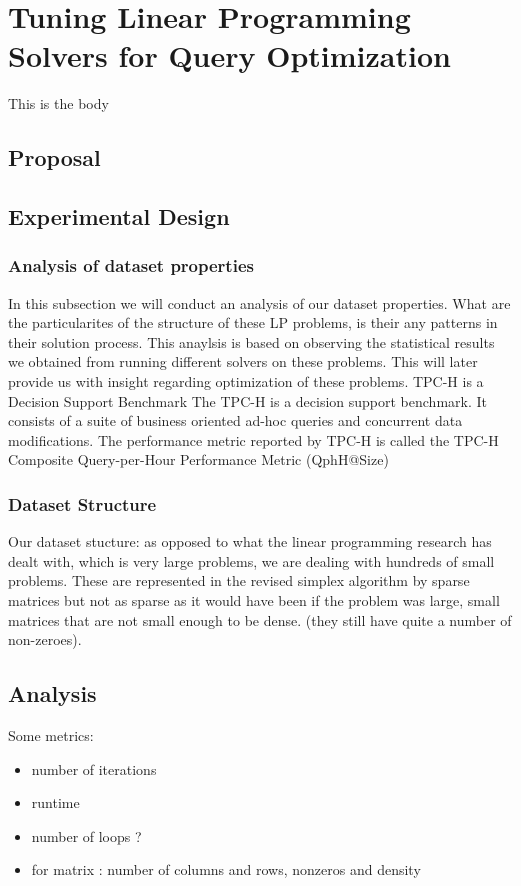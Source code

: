 
\chapter{Tuning Linear Programming Solvers for Query Optimization}\label{chapter:linearprogramming}
This is the body
\section{Proposal}

\section{Experimental Design}
\subsection{Analysis of dataset properties}
In  this subsection we will conduct an analysis of our dataset properties. What are the 
particularites of the structure of these LP problems, is their any patterns in their solution
process. This anaylsis is based on observing the statistical results we obtained from
running different solvers on these problems. This will later provide us with insight 
regarding optimization of these problems.
TPC-H is a Decision Support Benchmark
The TPC-H is a decision support benchmark. It consists 
of a suite of business oriented ad-hoc queries and concurrent data modifications. 
The performance metric reported by TPC-H is called the TPC-H Composite 
Query-per-Hour Performance Metric (QphH@Size) 


\subsection{Dataset Structure}
Our dataset stucture: 
as opposed to what the linear programming research has dealt with, which is 
very large problems, we are dealing with hundreds of small problems. These are represented
in the revised simplex algorithm by
sparse matrices but not as sparse as it would have been if the problem was large, 
small matrices that are not small enough to be dense. 
(they still have quite a number of non-zeroes).

\section{Analysis}
Some metrics:
\begin{itemize}
    \item number of iterations
    \item runtime
    \item number of loops ? 
    \item for matrix : number of columns and rows, nonzeros and density
\end{itemize}

